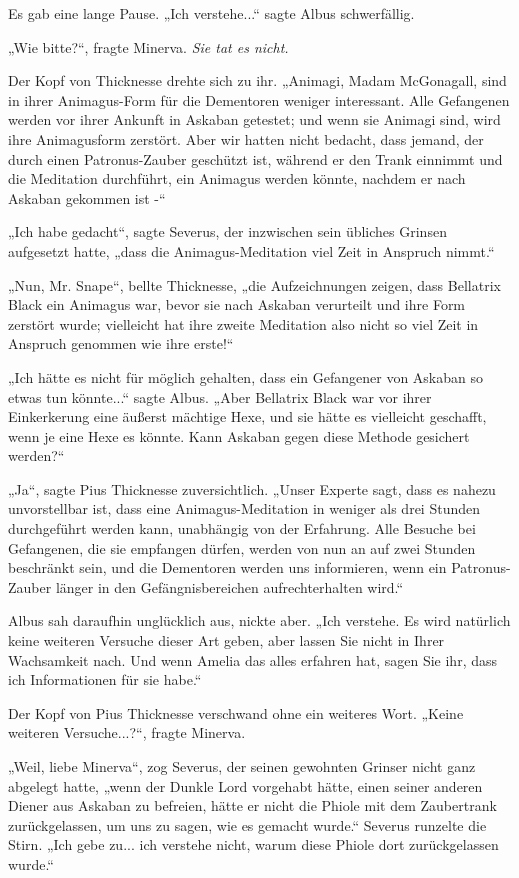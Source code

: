 {Es gab eine lange Pause. „Ich verstehe...“ sagte Albus schwerfällig.

„Wie bitte?“, fragte Minerva. \emph{Sie tat es nicht.}

Der Kopf von Thicknesse drehte sich zu ihr. „Animagi, Madam McGonagall, sind in ihrer Animagus-Form für die Dementoren weniger interessant. Alle Gefangenen werden vor ihrer Ankunft in Askaban getestet; und wenn sie Animagi sind, wird ihre Animagusform zerstört. Aber wir hatten nicht bedacht, dass jemand, der durch einen Patronus-Zauber geschützt ist, während er den Trank einnimmt und die Meditation durchführt, ein Animagus werden könnte, nachdem er nach Askaban gekommen ist -“

„Ich habe gedacht“, sagte Severus, der inzwischen sein übliches Grinsen aufgesetzt hatte, „dass die Animagus-Meditation viel Zeit in Anspruch nimmt.“

„Nun, Mr. Snape“, bellte Thicknesse, „die Aufzeichnungen zeigen, dass Bellatrix Black ein Animagus war, bevor sie nach Askaban verurteilt und ihre Form zerstört wurde; vielleicht hat ihre zweite Meditation also nicht so viel Zeit in Anspruch genommen wie ihre erste!“

„Ich hätte es nicht für möglich gehalten, dass ein Gefangener von Askaban so etwas tun könnte...“ sagte Albus. „Aber Bellatrix Black war vor ihrer Einkerkerung eine äußerst mächtige Hexe, und sie hätte es vielleicht geschafft, wenn je eine Hexe es könnte. Kann Askaban gegen diese Methode gesichert werden?“

„Ja“, sagte Pius Thicknesse zuversichtlich. „Unser Experte sagt, dass es nahezu unvorstellbar ist, dass eine Animagus-Meditation in weniger als drei Stunden durchgeführt werden kann, unabhängig von der Erfahrung. Alle Besuche bei Gefangenen, die sie empfangen dürfen, werden von nun an auf zwei Stunden beschränkt sein, und die Dementoren werden uns informieren, wenn ein Patronus-Zauber länger in den Gefängnisbereichen aufrechterhalten wird.“

Albus sah daraufhin unglücklich aus, nickte aber. „Ich verstehe. Es wird natürlich keine weiteren Versuche dieser Art geben, aber lassen Sie nicht in Ihrer Wachsamkeit nach. Und wenn Amelia das alles erfahren hat, sagen Sie ihr, dass ich Informationen für sie habe.“

Der Kopf von Pius Thicknesse verschwand ohne ein weiteres Wort. „Keine weiteren Versuche...?“, fragte Minerva.

„Weil, liebe Minerva“, zog Severus, der seinen gewohnten Grinser nicht ganz abgelegt hatte, „wenn der Dunkle Lord vorgehabt hätte, einen seiner anderen Diener aus Askaban zu befreien, hätte er nicht die Phiole mit dem Zaubertrank zurückgelassen, um uns zu sagen, wie es gemacht wurde.“ Severus runzelte die Stirn. „Ich gebe zu... ich verstehe nicht, warum diese Phiole dort zurückgelassen wurde.“

}
